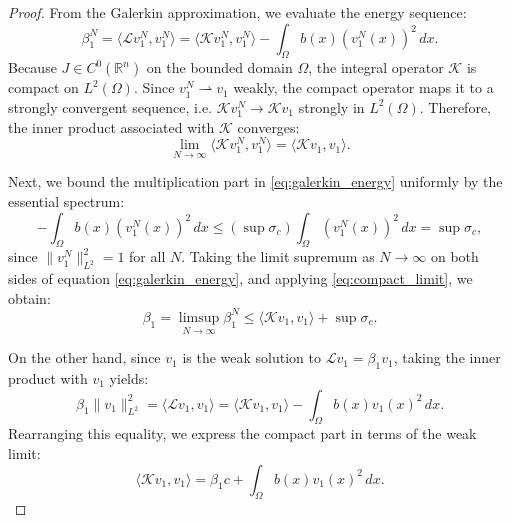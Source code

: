 \documentclass[11pt, a4paper]{article}
\theoremstyle{break}
\theoremstyle{break}
\theoremstyle{break}
\theoremstyle{break}
\theoremstyle{break}
\theoremstyle{break}
\theoremstyle{break}
\theoremstyle{break}
\theoremstyle{break}
\begin{document}
\begin{proof}
    From the Galerkin approximation, we evaluate the energy sequence:
    \begin{equation} \label{eq:galerkin_energy}
        \beta_1^N = \langle \mathcal{L} v_1^N, v_1^N \rangle = \langle \mathcal{K} v_1^N, v_1^N \rangle - \int_\Omega b(x) (v_1^N(x))^2 \, dx.
    \end{equation}
    Because $J \in C^0(\mathbb{R}^n)$ on the bounded domain $\Omega$, the integral operator $\mathcal{K}$ is compact on $L^2(\Omega)$. Since $v_1^N \rightharpoonup v_1$ weakly, the compact operator maps it to a strongly convergent sequence, i.e. $\mathcal{K} v_1^N \to \mathcal{K} v_1$ strongly in $L^2(\Omega)$. Therefore, the inner product associated with $\mathcal{K}$ converges:
    \begin{equation} \label{eq:compact_limit}
        \lim_{N \to \infty} \langle \mathcal{K} v_1^N, v_1^N \rangle = \langle \mathcal{K} v_1, v_1 \rangle.
    \end{equation}
    
    Next, we bound the multiplication part in \eqref{eq:galerkin_energy} uniformly by the essential spectrum:
    \begin{equation}
        -\int_\Omega b(x) (v_1^N(x))^2 \, dx \leq \left( \sup \sigma_c \right) \int_\Omega (v_1^N(x))^2 \, dx = \sup \sigma_c,
    \end{equation}
    since $\|v_1^N\|_{L^2}^2 = 1$ for all $N$.
    Taking the limit supremum as $N \to \infty$ on both sides of equation \eqref{eq:galerkin_energy}, and applying \eqref{eq:compact_limit}, we obtain:
    \begin{equation} \label{eq:energy_bound_1}
        \beta_1 = \limsup_{N \to \infty} \beta_1^N \leq \langle \mathcal{K} v_1, v_1 \rangle + \sup \sigma_c.
    \end{equation}
    
    On the other hand, since $v_1$ is the weak solution to $\mathcal{L} v_1 = \beta_1 v_1$, taking the inner product with $v_1$ yields:
    \begin{equation}
        \beta_1 \|v_1\|_{L^2}^2 = \langle \mathcal{L} v_1, v_1 \rangle = \langle \mathcal{K} v_1, v_1 \rangle - \int_\Omega b(x) v_1(x)^2 \, dx.
    \end{equation}
    Rearranging this equality, we express the compact part in terms of the weak limit:
    \begin{equation} \label{eq:weak_sol_K}
        \langle \mathcal{K} v_1, v_1 \rangle = \beta_1 c + \int_\Omega b(x) v_1(x)^2 \, dx.
    \end{equation}
    

\end{proof}
\end{document}
